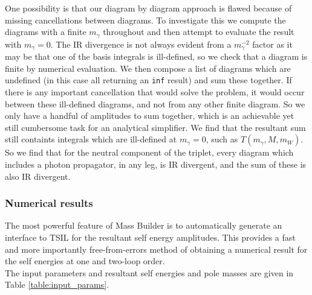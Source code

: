 \documentclass[11pt]{article}
\newcommand{\mb}{\textsf{Mass Builder} \! }
\newcommand{\tsil}{\textsf{TSIL} \! }
\begin{document}
One possibility is that our diagram by diagram approach is flawed because of missing cancellations between diagrams.  To investigate this we compute the diagrams with a finite $m_{\gamma}$ throughout and then attempt to evaluate the result with $m_{\gamma}=0$.  The IR divergence is not always evident from a $m_{\gamma}^{-2}$ factor as it may be that one of the basis integrals is ill-defined, so we check that a diagram is finite by numerical evaluation.  We then compose a list of diagrams which are undefined (in this case all returning an \lstinline{inf} result) and sum these together.  If there is any important cancellation that would solve the problem, it would occur between these ill-defined diagrams, and not from any other finite diagram.  So we only have a handful of amplitudes to sum together, which is an achievable yet still cumbersome task for an analytical simplifier.  We find that the resultant sum still containts integrals which are ill-defined at $m_{\gamma}=0$, such as $T(m_{\gamma},M,m_W)$.\\

So we find that for the neutral component of the triplet, every diagram which includes a photon propagator, in any leg, is IR divergent, and the sum of these is also IR divergent.


\subsubsection{Numerical results}

The most powerful feature of \mb is to automatically generate an interface to \tsil for the resultant self energy amplitudes.  This provides a fast and more importantly free-from-errors method of obtaining a numerical result for the self energies at one and two-loop order.\\

The input parameters and resultant self energies and pole masses are given in Table \ref{table:input_params}.
\end{document}
